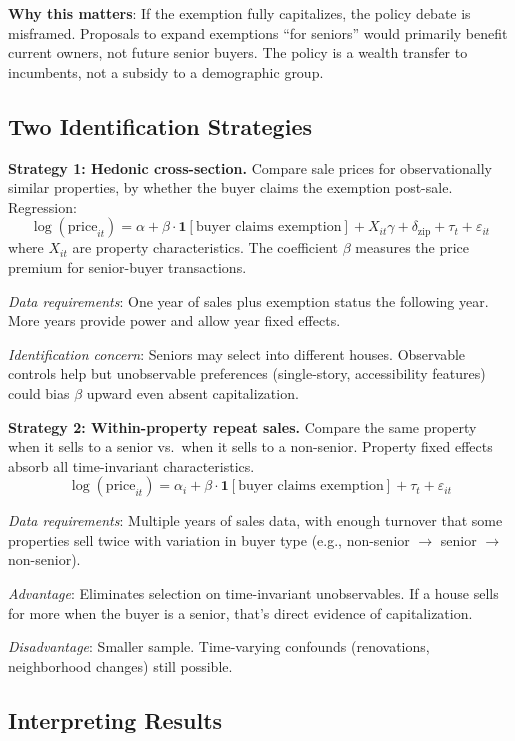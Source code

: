 \documentclass[11pt]{article}
\begin{document}
\textbf{Why this matters}: If the exemption fully capitalizes, the policy debate is misframed. Proposals to expand exemptions ``for seniors'' would primarily benefit current owners, not future senior buyers. The policy is a wealth transfer to incumbents, not a subsidy to a demographic group.

\subsection{Two Identification Strategies}

\textbf{Strategy 1: Hedonic cross-section.} Compare sale prices for observationally similar properties, by whether the buyer claims the exemption post-sale. Regression:
\[
\log(\text{price}_{it}) = \alpha + \beta \cdot \mathbf{1}[\text{buyer claims exemption}] + X_{it}\gamma + \delta_{\text{zip}} + \tau_t + \varepsilon_{it}
\]
where $X_{it}$ are property characteristics. The coefficient $\beta$ measures the price premium for senior-buyer transactions.

\textit{Data requirements}: One year of sales plus exemption status the following year. More years provide power and allow year fixed effects.

\textit{Identification concern}: Seniors may select into different houses. Observable controls help but unobservable preferences (single-story, accessibility features) could bias $\beta$ upward even absent capitalization.

\textbf{Strategy 2: Within-property repeat sales.} Compare the same property when it sells to a senior vs.\ when it sells to a non-senior. Property fixed effects absorb all time-invariant characteristics.
\[
\log(\text{price}_{it}) = \alpha_i + \beta \cdot \mathbf{1}[\text{buyer claims exemption}] + \tau_t + \varepsilon_{it}
\]

\textit{Data requirements}: Multiple years of sales data, with enough turnover that some properties sell twice with variation in buyer type (e.g., non-senior $\to$ senior $\to$ non-senior).

\textit{Advantage}: Eliminates selection on time-invariant unobservables. If a house sells for more when the buyer is a senior, that's direct evidence of capitalization.

\textit{Disadvantage}: Smaller sample. Time-varying confounds (renovations, neighborhood changes) still possible.

\subsection{Interpreting Results}
\end{document}
